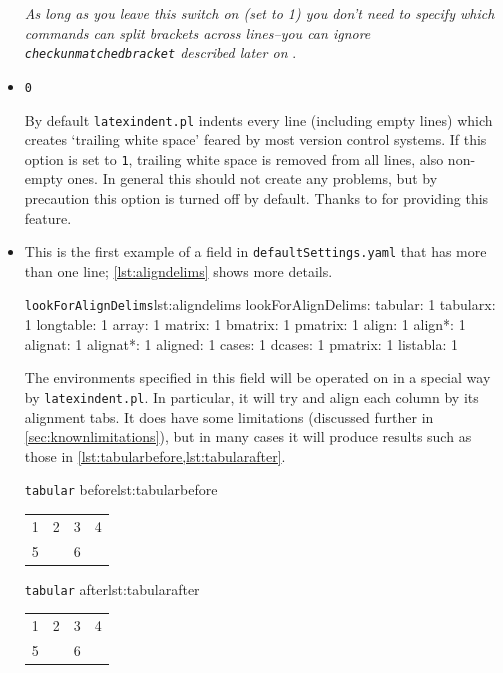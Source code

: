 \documentclass[11pt]{article}
\newcommand{\verbitem}[1]{\small\PVerb{#1}}
\begin{document}
\begin{itemize}
	      \emph{As long as you leave this switch on (set to 1) you don't need to specify which
	      	commands can split brackets across lines--you can ignore \lstinline!checkunmatchedbracket! described later on
	      	}.

	\item[\verbitem{removeTrailingWhitespace}] \lstinline!0!

	      By default \lstinline!latexindent.pl! indents every line (including empty lines)
	      which creates `trailing white space' feared by most version control systems. If
	      this option is set to \lstinline!1!, trailing white space is removed from all
	      lines, also non-empty ones. In general this should not create any problems, but
	      by precaution this option is turned off by default. Thanks to \cite{vosskuhle} for
	      providing this feature.

	\item[\verbitem{lookForAlignDelims}] This is the first example of a field
	      in \lstinline!defaultSettings.yaml! that has more than one line; \cref{lst:aligndelims}
	      shows more details.

	      \begin{cmhlistings}[style=yaml]{\lstinline!lookForAlignDelims!}{lst:aligndelims}
lookForAlignDelims:
   tabular: 1
   tabularx: 1
   longtable: 1
   array: 1
   matrix: 1
   bmatrix: 1
   pmatrix: 1
   align: 1
   align*: 1
   alignat: 1
   alignat*: 1
   aligned: 1
   cases: 1
   dcases: 1
   pmatrix: 1
   listabla: 1
	\end{cmhlistings}

	The environments specified in this field will be operated on in a special way  by \lstinline!latexindent.pl!. In particular, it will try and align each column by its alignment
	tabs. It does have some limitations (discussed further in \cref{sec:knownlimitations}),
	but in many cases it will produce results such as those in \cref{lst:tabularbefore,lst:tabularafter}.

	\begin{minipage}{.5\textwidth}
		\begin{cmhlistings}[style=demo,columns=fixed]{\lstinline!tabular! before}{lst:tabularbefore}
\begin{tabular}{cccc}
1&	2 &3       &4\\
5& &6       &\\
\end{tabular}
		\end{cmhlistings}
	\end{minipage}%
	\begin{minipage}{.5\textwidth}
		\begin{cmhlistings}[style=demo,columns=fixed]{\lstinline!tabular! after}{lst:tabularafter}
\begin{tabular}{cccc}
 1 & 2 & 3 & 4 \\
 5 &   & 6 &   \\
\end{tabular}
		\end{cmhlistings}
	\end{minipage}


\end{itemize}
\end{document}
